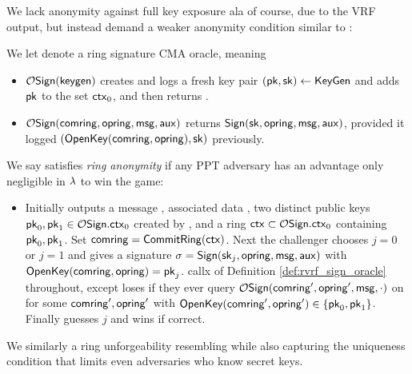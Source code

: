 We lack anonymity against full key exposure ala
 \cite[pp. 6 Def. 4]{cryptoeprint:2005:304} of course, due to the VRF output,
but instead demand a weaker anonymity condition similar to
 \cite[pp. 5 Def. 3]{cryptoeprint:2005:304}:

\begin{definition}\label{def:rvrf_sign_oracle}
We let  denote a ring signature CMA oracle, meaning
\begin{itemize}
\item $\mathcal{O}\mathsf{Sign}(\mathsf{keygen})$ creates and logs a fresh key pair
 $(\mathsf{pk},\mathsf{sk}) \leftarrow {\ensuremath{\mathsf{KeyGen}}}$ and adds $\mathsf{pk}$ to the set $\mathsf{ctx}_0$, and then returns \pk.
\item $\mathcal{O}\mathsf{Sign}(\mathsf{comring},\mathsf{opring},\mathsf{msg},\mathsf{aux})$ returns
 ${\mathsf{Sign}}(\mathsf{sk},\mathsf{opring},\mathsf{msg},\mathsf{aux})$, provided it logged $({\mathsf{OpenKey}}(\mathsf{comring},\mathsf{opring}),\mathsf{sk})$ previously.
\end{itemize}
\end{definition}

\begin{definition}
We say \rVRF satisfies {\em ring anonymity} if
any PPT adversary \adv has an advantage only
 negligible in $\lambda$ to win the game:
\begin{itemize}
\item[]
 Initially \adv outputs a message \msg, associated data \aux,
 two distinct public keys $\mathsf{pk}_0,\mathsf{pk}_1 \in \mathcal{O}\mathsf{Sign}.\mathsf{ctx}_0$ created by ,
 and a ring $\mathsf{ctx} \subset \mathcal{O}\mathsf{Sign}.\mathsf{ctx}_0$ containing $\mathsf{pk}_0,\mathsf{pk}_1$.
 Set $\mathsf{comring} = {\mathsf{CommitRing}}(\mathsf{ctx})$.
 Next the challenger chooses $j=0$ or $j=1$ and gives
  \adv a signature $\sigma = {\mathsf{Sign}}(\mathsf{sk}_j,\mathsf{opring},\mathsf{msg},\mathsf{aux})$ with ${\mathsf{OpenKey}}(\mathsf{comring},\mathsf{opring}) = \mathsf{pk}_j$.
 \adv callx  of Definition \ref{def:rvrf_sign_oracle} throughout,
 except \adv loses if they ever query $\mathcal{O}\mathsf{Sign}(\mathsf{comring}',\mathsf{opring}',\mathsf{msg},\cdot)$
 on \msg for some $\mathsf{comring}',\mathsf{opring}'$ with ${\mathsf{OpenKey}}(\mathsf{comring}',\mathsf{opring}') \in \{ \mathsf{pk}_0, \mathsf{pk}_1 \}$.
 Finally \adv guesses $j$ and wins if correct.
\end{itemize}
\end{definition}

We similarly a ring unforgeability resembling
 \cite[pp. 7 Def. 7]{cryptoeprint:2005:304} %
while also capturing the uniqueness condition that limits even adversaries who know secret keys.

